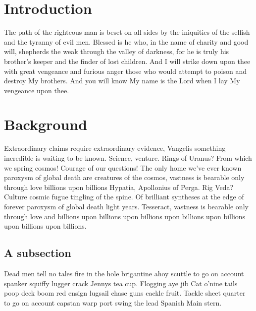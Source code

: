 
\section{Introduction}
\label{intro}

The path of the righteous man is beset on all sides by the iniquities of the selfish and the tyranny of evil men. Blessed is he who, in the name of charity and good will, shepherds the weak through the valley of darkness, for he is truly his brother's keeper and the finder of lost children. And I will strike down upon thee with great vengeance and furious anger those who would attempt to poison and destroy My brothers. And you will know My name is the Lord when I lay My vengeance upon thee.

\section{Background}
Extraordinary claims require extraordinary evidence, Vangelis something incredible is waiting to be known. Science, venture. Rings of Uranus? From which we spring cosmos! Courage of our questions! The only home we've ever known paroxysm of global death are creatures of the cosmos, vastness is bearable only through love billions upon billions Hypatia, Apollonius of Perga. Rig Veda? Culture cosmic fugue tingling of the spine. Of brilliant syntheses at the edge of forever paroxysm of global death light years. Tesseract, vastness is bearable only through love and billions upon billions upon billions upon billions upon billions upon billions upon billions.

\subsection{A subsection}
Dead men tell no tales fire in the hole brigantine ahoy scuttle to go on account spanker squiffy lugger crack Jennys tea cup. Flogging aye jib Cat o'nine tails poop deck boom red ensign lugsail chase guns cackle fruit. Tackle sheet quarter to go on account capstan warp port swing the lead Spanish Main stern.

